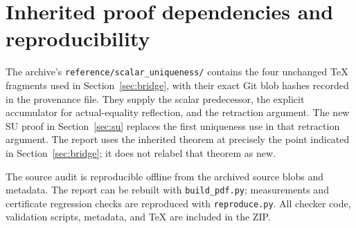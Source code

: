 \documentclass[11pt]{article}
\theoremstyle{definition}
\newcommand{\file}[1]{{\small\nolinkurl{#1}}}
\begin{document}
\appendix
\section{Inherited proof dependencies and reproducibility}
\label{app:inherited}

The archive's \file{reference/scalar_uniqueness/} contains the four unchanged TeX fragments used in Section~\ref{sec:bridge}, with their exact Git blob hashes recorded in the provenance file. They supply the scalar predecessor, the explicit accumulator for actual-equality reflection, and the retraction argument. The new SU proof in Section~\ref{sec:su} replaces the first uniqueness use in that retraction argument. The report uses the inherited theorem at precisely the point indicated in Section~\ref{sec:bridge}; it does not relabel that theorem as new.

The source audit is reproducible offline from the archived source blobs and metadata. The report can be rebuilt with \file{build_pdf.py}; measurements and certificate regression checks are reproduced with \file{reproduce.py}. All checker code, validation scripts, metadata, and TeX are included in the ZIP.
\end{document}
